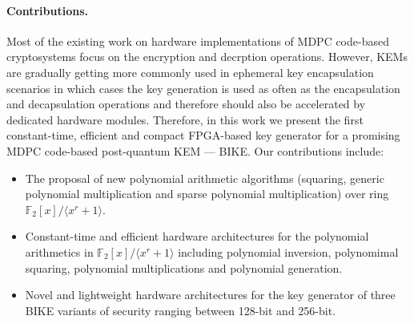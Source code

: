 \documentclass[runningheads]{llncs}
\begin{document}
\paragraph{Contributions.} Most of the existing work on hardware implementations of MDPC code-based
cryptosystems focus on the encryption and decrption operations.
However, KEMs are gradually getting more commonly used in ephemeral
key encapsulation scenarios in which cases the key
generation is used as often as the encapsulation and decapsulation operations
and therefore should also be accelerated by dedicated hardware modules.
Therefore, in this work we present the first constant-time, efficient and compact
FPGA-based key generator for a promising MDPC code-based post-quantum KEM \mbox{---} BIKE.
Our contributions include:
\begin{itemize}
  \item The proposal of new polynomial arithmetic algorithms (squaring, generic polynomial multiplication and sparse polynomial multiplication) over ring $\mathbb{F}_2[x]/\langle x^r+1\rangle$.
  \item Constant-time and efficient hardware architectures for the polynomial arithmetics
  in $\mathbb{F}_2[x]/\langle x^r+1\rangle$ including polynomial inversion, polynomimal squaring, polynomial multiplications and
  polynomial generation.
  \item Novel and lightweight hardware architectures for the key generator of three BIKE variants of security ranging
  between 128-bit and 256-bit.
\end{itemize}

\end{document}
